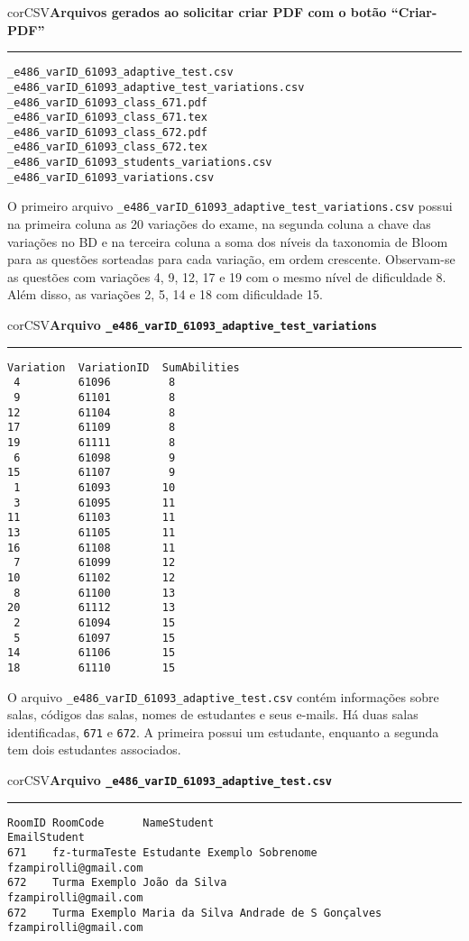 \begin{myboxCode}{corCSV}{\textbf{Arquivos gerados ao solicitar criar PDF com o botão ``Criar-PDF''}}\vspace{3mm}
\hrule
\begin{verbatim}
_e486_varID_61093_adaptive_test.csv
_e486_varID_61093_adaptive_test_variations.csv
_e486_varID_61093_class_671.pdf
_e486_varID_61093_class_671.tex
_e486_varID_61093_class_672.pdf
_e486_varID_61093_class_672.tex
_e486_varID_61093_students_variations.csv
_e486_varID_61093_variations.csv
\end{verbatim}
\end{myboxCode}

O primeiro arquivo \verb|_e486_varID_61093_adaptive_test_variations.csv| possui na primeira coluna as 20 variações do exame, na segunda coluna a chave das variações no BD e na terceira coluna a soma dos níveis da taxonomia de Bloom para as questões sorteadas para cada variação, em ordem crescente. Observam-se as questões com variações 4, 9, 12, 17 e 19 com o mesmo nível de dificuldade 8. Além disso, as variações 2, 5, 14 e 18 com dificuldade 15.


\begin{myboxCode}{corCSV}{\textbf{Arquivo \texttt{\_e486\_varID\_61093\_adaptive\_test\_variations}}}\vspace{3mm}
\hrule
\begin{verbatim}
Variation  VariationID  SumAbilities
 4         61096         8
 9         61101         8
12         61104         8
17         61109         8
19         61111         8
 6         61098         9
15         61107         9
 1         61093        10
 3         61095        11
11         61103        11
13         61105        11
16         61108        11
 7         61099        12
10         61102        12
 8         61100        13
20         61112        13
 2         61094        15
 5         61097        15
14         61106        15
18         61110        15
\end{verbatim}
\end{myboxCode}



O arquivo \verb|_e486_varID_61093_adaptive_test.csv| contém informações sobre salas, códigos das salas, nomes de estudantes e seus e-mails. Há duas salas identificadas, \verb|671| e \verb|672|. A primeira possui um estudante, enquanto a segunda tem dois estudantes associados.

\begin{myboxCode}{corCSV}{\textbf{Arquivo \texttt{\_e486\_varID\_61093\_adaptive\_test.csv}}}\vspace{3mm}
\hrule
\begin{verbatim}
RoomID RoomCode      NameStudent                           EmailStudent
671    fz-turmaTeste Estudante Exemplo Sobrenome           fzampirolli@gmail.com 
672    Turma Exemplo João da Silva                         fzampirolli@gmail.com 
672    Turma Exemplo Maria da Silva Andrade de S Gonçalves fzampirolli@gmail.com    
\end{verbatim}
\end{myboxCode}

